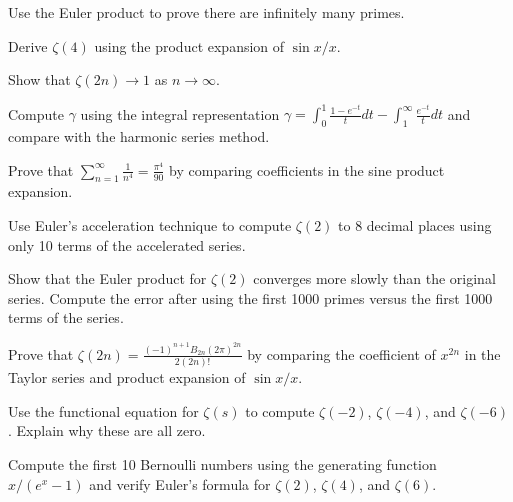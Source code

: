 \begin{exercise}
Use the Euler product to prove there are infinitely many primes.
\end{exercise}

\begin{exercise}
Derive $\zeta(4)$ using the product expansion of $\sin x / x$.
\end{exercise}

\begin{exercise}
Show that $\zeta(2n) \to 1$ as $n \to \infty$.
\end{exercise}

\begin{exercise}
Compute $\gamma$ using the integral representation $\gamma = \int_0^1 \frac{1-e^{-t}}{t} dt - \int_1^{\infty} \frac{e^{-t}}{t} dt$ and compare with the harmonic series method.
\end{exercise}

\begin{exercise}
Prove that $\sum_{n=1}^{\infty} \frac{1}{n^4} = \frac{\pi^4}{90}$ by comparing coefficients in the sine product expansion.
\end{exercise}

\begin{exercise}
Use Euler's acceleration technique to compute $\zeta(2)$ to 8 decimal places using only 10 terms of the accelerated series.
\end{exercise}

\begin{exercise}
Show that the Euler product for $\zeta(2)$ converges more slowly than the original series. Compute the error after using the first 1000 primes versus the first 1000 terms of the series.
\end{exercise}

\begin{exercise}
Prove that $\zeta(2n) = \frac{(-1)^{n+1} B_{2n} (2\pi)^{2n}}{2(2n)!}$ by comparing the coefficient of $x^{2n}$ in the Taylor series and product expansion of $\sin x / x$.
\end{exercise}

\begin{exercise}
Use the functional equation for $\zeta(s)$ to compute $\zeta(-2)$, $\zeta(-4)$, and $\zeta(-6)$. Explain why these are all zero.
\end{exercise}

\begin{exercise}
Compute the first 10 Bernoulli numbers using the generating function $x/(e^x - 1)$ and verify Euler's formula for $\zeta(2)$, $\zeta(4)$, and $\zeta(6)$.
\end{exercise}

